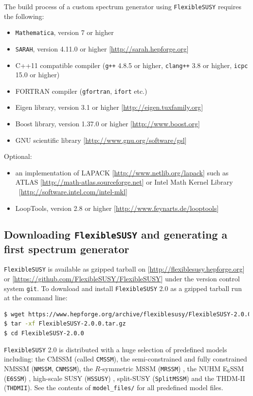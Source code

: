 \documentclass[final,3p,11pt,pdflatex]{elsarticle}
\makeatletter
\newcommand{\modelname}[1]{\texttt{#1}\@\xspace}
\newcommand{\sarah}{\texttt{SARAH}\@\xspace}
\newcommand{\fs}{\texttt{FlexibleSUSY}\@\xspace}
\newcommand{\HSSUSY}{\modelname{HSSUSY}}
\newcommand{\fstwo}{\fs 2.0\@\xspace}
\newcommand{\mathematica}{\texttt{Ma\-the\-ma\-ti\-ca}\xspace}
\newcommand{\ESSM}{E$_6$SSM\@\xspace}
\newcommand{\code}[1]{\lstinline|#1|}  %
\makeatother
\begin{document}
The build process of a custom spectrum generator using \fs requires
the following:
%
\begin{itemize}
\item \mathematica, version 7 or higher
\item \sarah, version 4.11.0 or higher [\url{http://sarah.hepforge.org}]
\item C++11 compatible compiler (\texttt{g++} 4.8.5 or higher,
  \texttt{clang++} 3.8 or higher, \texttt{icpc} 15.0 or higher)
\item FORTRAN compiler (\texttt{gfortran}, \texttt{ifort} etc.)
\item Eigen library, version 3.1 or higher
  [\url{http://eigen.tuxfamily.org}]
\item Boost library, version 1.37.0 or higher
  [\url{http://www.boost.org}]
\item GNU scientific library [\url{http://www.gnu.org/software/gsl}]
\end{itemize}
%
Optional:
%
\begin{itemize}
\item an implementation of LAPACK [\url{http://www.netlib.org/lapack}]
  such as ATLAS [\url{http://math-atlas.sourceforge.net}] or
  Intel Math Kernel Library\\\ [\url{http://software.intel.com/intel-mkl}]
\item LoopTools, version 2.8 or higher
  [\url{http://www.feynarts.de/looptools}]
\end{itemize}

\subsection{Downloading \fs and generating a first spectrum generator}
\label{sec:quick-start-cmssm}
\fs is available as gzipped tarball on
[\url{http://flexiblesusy.hepforge.org}] or
[\url{https://github.com/FlexibleSUSY/FlexibleSUSY}] under the version
control system \texttt{git}.
%
To download and install \fstwo as a gzipped tarball run at the command
line:
%
\begin{lstlisting}[language=bash]
$ wget https://www.hepforge.org/archive/flexiblesusy/FlexibleSUSY-2.0.0.tar.gz
$ tar -xf FlexibleSUSY-2.0.0.tar.gz
$ cd FlexibleSUSY-2.0.0
\end{lstlisting}%
%
\fstwo is distributed with a huge selection of predefined models
including: the CMSSM (called \modelname{CMSSM}), the semi-constrained and
fully constrained NMSSM (\modelname{NMSSM}, \modelname{CNMSSM}), the
$R$-symmetric MSSM (\modelname{MRSSM}) \cite{Kribs:2007ac}, the NUHM \ESSM
(\modelname{E6SSM}) \cite{Athron:2007en}, high-scale SUSY (\HSSUSY)
\cite{Bagnaschi:2015pwa}, split-SUSY (\modelname{SplitMSSM})
\cite{Bagnaschi:2015pwa} and the THDM-II (\modelname{THDMII}).  See the
contents of \code{model_files/} for all predefined model files.
\end{document}
